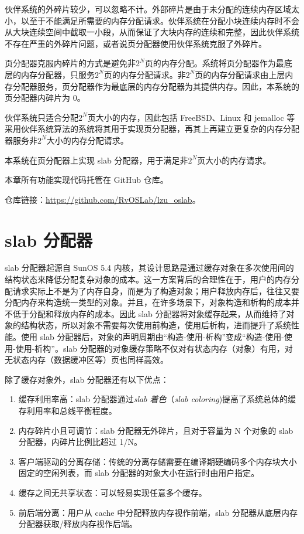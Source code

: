 \documentclass[AutoFakeBold]{LZUThesis}
\begin{document}
\begin{sloppypar}
伙伴系统的外碎片较少，可以忽略不计。外部碎片是由于未分配的连续内存区域太小，以至于不能满足所需要的内存分配请求。伙伴系统在分配小块连续内存时不会从大块连续空间中截取一小段，从而保证了大块内存的连续和完整，因此伙伴系统不存在严重的外碎片问题，或者说页分配器使用伙伴系统克服了外碎片。

页分配器克服内碎片的方式是避免非\(2^N\)页的内存分配。系统将页分配器作为最底层的内存分配器，只服务\(2^N\)页的内存分配请求。非\(2^N\)页的内存分配请求由上层内存分配器服务，页分配器作为最底层的内存分配器为其提供内存。因此，本系统的页分配器内碎片为
0。

伙伴系统只适合分配\(2^N\)页大小的内存，因此包括 FreeBSD、Linux 和
jemalloc
等采用伙伴系统算法的系统将其用于实现页分配器，再其上再建立更复杂的内存分配器服务非\(2^N\)大小的内存分配请求。

本系统在页分配器上实现 slab 分配器，用于满足非\(2^N\)页大小的内存请求。

本章所有功能实现代码托管在 GitHub 仓库。

仓库链接：\href{https://github.com/RvOSLab/lzu_oslab}{https://github.com/RvOSLab/lzu\_oslab}。

\chapter{slab 分配器}

slab 分配器起源自 SunOS 5.4{\cite{bonwick1994slab}}
内核，其设计思路是通过缓存对象在多次使用间的结构状态来降低分配复杂对象的成本。这一方案背后的合理性在于，用户的内存分配请求实际上不是为了内存自身，而是为了构造对象；用户释放内存后，往往又要分配内存来构造统一类型的对象。并且，在许多场景下，对象构造和析构的成本并不低于分配和释放内存的成本。因此
slab
分配器将对象缓存起来，从而维持了对象的结构状态，所以对象不需要每次使用前构造，使用后析构，进而提升了系统性能。使用
slab
分配器后，对象的声明周期由``构造-使用-析构''变成``构造-使用-使用-使用-析构''。slab
分配器的对象缓存策略不仅对有状态内存（对象）有用，对无状态内存（数据缓冲区等）页也同样高效。

除了缓存对象外，slab 分配器还有以下优点：

\begin{enumerate}
\def\labelenumi{\arabic{enumi}.}
\item
  缓存利用率高：slab 分配器通过\emph{slab 着色}（\emph{slab
  coloring})提高了系统总体的缓存利用率和总线平衡程度。
\item
  内存碎片小且可调节：slab 分配器无外碎片，且对于容量为 N 个对象的 slab
  分配器，内碎片比例比超过 1/N。
\item
  客户端驱动的分离存储：传统的分离存储需要在编译期硬编码多个内存块大小固定的空闲列表，而
  slab 分配器的对象大小在运行时由用户指定。
\item
  缓存之间无共享状态：可以轻易实现任意多个缓存。
\item
  前后端分离：用户从 cache 中分配释放内存视作前端，slab
  分配器从底层内存分配器获取/释放内存视作后端。
\end{enumerate}


\end{sloppypar}
\end{document}
